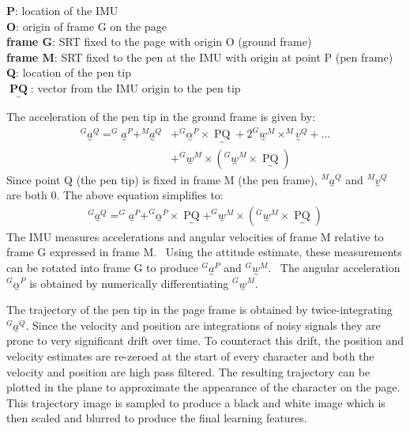 \documentclass{article}
\newcommand{\nosymbol}{}
\newcommand{\tmop}[1]{\ensuremath{\operatorname{#1}}}
\begin{document}
\textbf{P}: location of the IMU \\
\textbf{O}: origin of frame G on the page \\
\textbf{frame G}: SRT fixed to the page with origin O (ground frame) \\
\textbf{frame M}: SRT fixed to the pen at the IMU with origin at point P (pen frame) \\
\textbf{Q}: location of the pen tip \\
$\underset{\mbox{\textasciitilde}}{\tmop{\textbf{PQ}}}$: vector from the IMU origin to
the pen tip

The acceleration of the pen tip in the ground frame is given by:
\begin{align*}
  ^G \underset{\mbox{\textasciitilde}}{a}^Q =^G
  \underset{\mbox{\textasciitilde}}{a}^P +^M
  \underset{\mbox{\textasciitilde}}{a}^Q &+^G
  \underset{\mbox{\textasciitilde}}{\alpha}^P \times
  \underset{\mbox{\textasciitilde}}{\tmop{PQ}} + 2^G
  \underset{\mbox{\textasciitilde}}{w}^M \times^M
  \underset{\mbox{\textasciitilde}}{v}^Q + ... \\ &+ ^G 
  \underset{\mbox{\textasciitilde}}{w}^M \times \left(^G
  \underset{\mbox{\textasciitilde}}{w}^M \times
  \underset{\mbox{\textasciitilde}}{\tmop{PQ}} \right)
\end{align*}
Since point Q (the pen tip) is fixed in frame M (the pen frame), $^M
\underset{\mbox{\textasciitilde}}{a}^Q$ and $^M
\underset{\mbox{\textasciitilde}}{v}^Q$ are both 0. The above equation simplifies to:
\begin{eqnarray*}
  & ^G \underset{\mbox{\textasciitilde}}{a}^Q =^G
  \underset{\mbox{\textasciitilde}}{a}^P +^G
  \underset{\mbox{\textasciitilde}}{\alpha}^P \times
  \underset{\mbox{\textasciitilde}}{\tmop{PQ}} +^G
  \underset{\mbox{\textasciitilde}}{w}^M \times \left(^G
  \underset{\mbox{\textasciitilde}}{w}^M \times
  \underset{\mbox{\textasciitilde}}{\tmop{PQ}} \right) & 
\end{eqnarray*}
The IMU measures accelerations and angular velocities of frame M relative to frame G expressed in frame M. \ Using the attitude estimate, these measurements can be rotated into frame G to produce $^G
\underset{\mbox{\textasciitilde}}{a}^P$ and $^G
\underset{\mbox{\textasciitilde}}{w}^M \nosymbol$. \ The angular acceleration
$^G \underset{\mbox{\textasciitilde}}{\alpha}^P$ is obtained by numerically
differentiating $^G \underset{\mbox{\textasciitilde}}{w}^M$.

The trajectory of the pen tip in the page frame is obtained by twice-integrating $^G \underset{\mbox{\textasciitilde}}{a}^Q$.
Since the velocity and position are integrations of noisy signals they are prone to very significant drift over time. To counteract this drift, the position and velocity estimates are re-zeroed at the start of every character and both the velocity and position are high pass filtered. The resulting trajectory can be plotted in the plane to approximate the appearance of the character on the page. This trajectory image is sampled to produce a black and white image which is then scaled and blurred to produce the final learning features.
 
\end{document}
